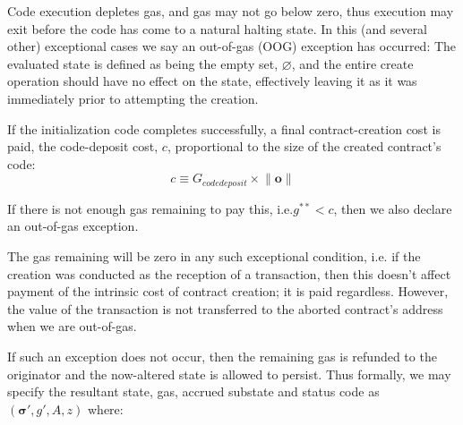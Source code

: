 \documentclass[9pt,oneside]{amsart}
\makeatletter
\newcommand*\ie{i.e.\@\xspace}
\makeatother
\begin{document}
\begin{multicols}{2}
Code execution depletes gas, and gas may not go below zero, thus execution may exit before the code has come to a natural halting state. In this (and several other) exceptional cases we say an out-of-gas (OOG) exception has occurred: The evaluated state is defined as being the empty set, $\varnothing$, and the entire create operation should have no effect on the state, effectively leaving it as it was immediately prior to attempting the creation.

If the initialization code completes successfully, a final contract-creation cost is paid, the code-deposit cost, $c$, proportional to the size of the created contract's code:
\begin{equation}
c \equiv G_{codedeposit} \times \lVert \mathbf{o} \rVert
\end{equation}

If there is not enough gas remaining to pay this, \ie $g^{**} < c$, then we also declare an out-of-gas exception.

The gas remaining will be zero in any such exceptional condition, \ie if the creation was conducted as the reception of a transaction, then this doesn't affect payment of the intrinsic cost of contract creation; it is paid regardless. However, the value of the transaction is not transferred to the aborted contract's address when we are out-of-gas.

If such an exception does not occur, then the remaining gas is refunded to the originator and the now-altered state is allowed to persist. Thus formally, we may specify the resultant state, gas, accrued substate and status code as $(\boldsymbol{\sigma}', g', A, z)$ where:


\end{multicols}
\end{document}
